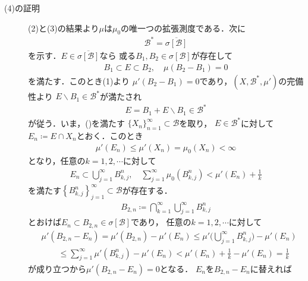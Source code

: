 \begin{prf}
\begin{description}
				\item[(4)の証明]
					(2)と(3)の結果より$\mu$は$\mu_0$の唯一つの拡張測度である．次に
					\begin{align}
						\mathcal{B}^* = \overline{\sigma[\mathcal{B}]}
						\label{eq:appendix_finite_additive_measure_expansion_4}
					\end{align}
					を示す．$E \in \overline{\sigma[\mathcal{B}]}$なら
					或る$B_1,B_2 \in \sigma[\mathcal{B}]$が存在して
					\begin{align}
						B_1 \subset E \subset B_2, \quad \mu(B_2 - B_1) = 0
					\end{align}
					を満たす．このとき(1)より
					$\mu'(B_2 - B_1) = 0$であり，$\left( X,\mathcal{B}^*,\mu' \right)$の完備性より
					$E \backslash B_1 \in \mathcal{B}^*$が満たされ
					\begin{align}
						E = B_1 + E \backslash B_1 \in \mathcal{B}^*
					\end{align}
					が従う．いま，()を満たす
					$\{X_n\}_{n=1}^\infty \subset \mathcal{B}$を取り，
					$E \in \mathcal{B}^*$に対して$E_n \coloneqq E \cap X_n$とおく．このとき
					\begin{align}
						\mu'(E_n) \leq \mu'(X_n) = \mu_0(X_n) < \infty
					\end{align}
					となり，任意の$k = 1,2,\cdots$に対して
					\begin{align}
						E_n \subset \bigcup_{j=1}^\infty B^n_{k,j},
						\quad
						\sum_{j=1}^\infty \mu_0\left( B^n_{k,j} \right)
						< \mu'(E_n) + \frac{1}{k}
					\end{align}
					を満たす$\left\{B^n_{k,j}\right\}_{j=1}^\infty \subset \mathcal{B}$が存在する．
					\begin{align}
						B_{2,n} \coloneqq \bigcap_{k=1}^\infty \bigcup_{j=1}^\infty B^n_{k,j}
					\end{align}
					とおけば$E_n \subset B_{2,n} \in \sigma[\mathcal{B}]$であり，
					任意の$k = 1,2,\cdots$に対して
					\begin{align}
						&\mu'(B_{2,n} - E_n) = \mu'(B_{2,n}) - \mu'(E_n)
						\leq \mu'\Biggl( \bigcup_{j=1}^\infty B^n_{k,j} \Biggr) - \mu'(E_n) \\
						&\qquad \leq \sum_{j=1}^\infty \mu'\left( B^n_{k,j} \right) - \mu'(E_n)
						< \mu'(E_n) + \frac{1}{k} - \mu'(E_n)
						= \frac{1}{k}
					\end{align}
					が成り立つから$\mu'(B_{2,n} - E_n) = 0$となる．
					$E_n$を$B_{2,n} - E_n$に替えれば
					\begin{align}

\end{align}
\end{description}
\end{prf}
